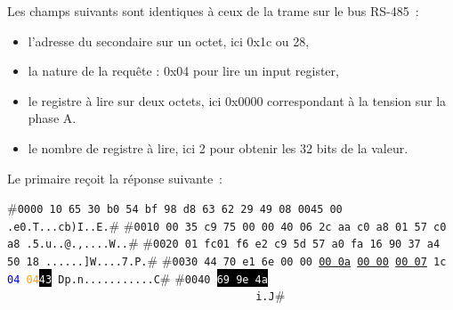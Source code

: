     \vspace{1em}

Les champs suivants sont identiques à ceux de la trame sur le bus RS-485~:
\begin{itemize}
    \item l'adresse du secondaire sur un octet, ici 0x1c ou 28,
    \item la nature de la requête : 0x04 pour lire un input register,
    \item le registre à lire sur deux octets, ici 0x0000 correspondant à la tension sur la phase A.
    \item le nombre de registre à lire, ici 2 pour obtenir les 32 bits de la valeur.
\end{itemize}

    \vspace{1em}

Le primaire reçoit la réponse suivante~:

\begin{termc}[backgroundcolor=\color{backcolour}, escapechar=#]
#\texttt{\small{0000  \colorbox{purple!50}{10 65 30 b0 54 bf 98 d8 63 62 29 49 08 00}\colorbox{blue!30}{45 00}   .e0.T...cb)I..E.}}# 
#\texttt{\small{0010  \colorbox{blue!30}{00 35 c9 75 00 00 40 06 2c aa c0 a8 01 57 c0 a8}   .5.u..@.,....W..}}# 
#\texttt{\small{0020  \colorbox{blue!30}{01 fc}\colorbox{red!30}{01 f6 e2 c9 5d 57 a0 fa 16 90 37 a4 50 18}   ......]W....7.P.}}# 
#\texttt{\small{0030  \colorbox{red!30}{44 70 e1 6e 00 00} \ul{00 0a} \ul{00 00} \ul{00 07} 1c \textcolor{blue}{04} \textcolor{orange}{04}\colorbox{black}{\textcolor{white}{43}}   Dp.n...........C}}# 
#\texttt{\small{0040  \colorbox{black}{\textcolor{white}{69 9e 4a}} \ \ \ \ \ \ \ \ \ \ \ \ \ \ \ \ \ \ \ \ \ \ \ \ \ \ \ \ \ \ \ \ \ \ \ \ \ \ \ i.J}}# 
                           
\end{termc}

